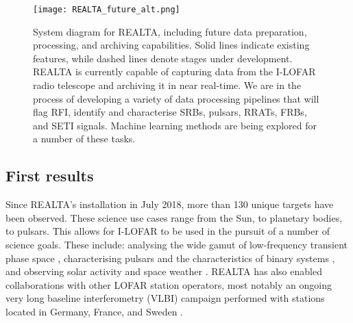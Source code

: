 \begin{figure}[t]
    \centering
    \texttt{[image: REALTA\_future\_alt.png]}
    \caption[System diagram for REALTA.]{System diagram for REALTA, including future data preparation, processing, and archiving capabilities. Solid lines indicate existing features, while dashed lines denote stages under development. REALTA is currently capable of capturing data from the I-LOFAR radio telescope and archiving it in near real-time. We are in the process of developing a variety of data processing pipelines that will flag RFI, identify and characterise SRBs, pulsars, RRATs, FRBs, and SETI signals. Machine learning methods are being explored for a number of these tasks.}
    \label{fig:REALTA_future}
\end{figure}


\subsection{First results}
\label{sec:results}
Since REALTA's installation in July 2018, more than 130 unique targets have been observed. These science use cases range from the Sun, to planetary bodies, to pulsars. This allows for I-LOFAR to be used in the pursuit of a number of science goals. These include: analysing the wide gamut of low-frequency transient phase space \citep{KeanePhaseSpace2018}, characterising pulsars and the characteristics of binary systems \citep{Manchester2017}, and observing solar activity and space weather \citep{Maguire2020}. 
REALTA has also enabled collaborations with other LOFAR station operators, most notably an ongoing very long baseline interferometry (VLBI) campaign performed with stations located in Germany, France, and Sweden \citep[in a continuation of ][]{Wucknitz2019}.

